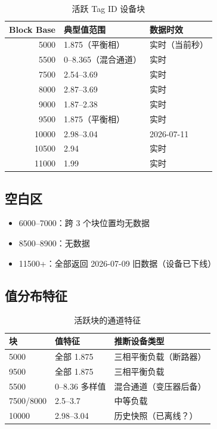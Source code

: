 \documentclass[12pt,a4paper]{ctexart}
\begin{document}
\begin{table}[H]\centering
\caption{活跃 Tag ID 设备块}
\begin{tabular}{rll}
\toprule
\textbf{Block Base} & \textbf{典型值范围} & \textbf{数据时效} \\
\midrule
5000 & 1.875（平衡相） & 实时（当前秒） \\
5500 & 0--8.365（混合通道） & 实时 \\
7500 & 2.54--3.69 & 实时 \\
8000 & 2.87--3.69 & 实时 \\
9000 & 1.87--2.38 & 实时 \\
9500 & 1.875（平衡相） & 实时 \\
10000 & 2.98--3.04 & 2026-07-11 \\
10500 & 2.94 & 实时 \\
11000 & 1.99 & 实时 \\
\bottomrule
\end{tabular}
\end{table}

\subsection{空白区}
\begin{itemize}[leftmargin=*]
  \item 6000--7000：跨 3 个块位置均无数据
  \item 8500--8900：无数据
  \item 11500+：全部返回 2026-07-09 旧数据（设备已下线）
\end{itemize}

\subsection{值分布特征}
\begin{table}[H]\centering
\caption{活跃块的通道特征}
\begin{tabular}{lll}
\toprule
\textbf{块} & \textbf{值特征} & \textbf{推断设备类型} \\
\midrule
5000 & 全部 1.875 & 三相平衡负载（断路器） \\
9500 & 全部 1.875 & 三相平衡负载 \\
5500 & 0--8.36 多样值 & 混合通道（变压器后备） \\
7500/8000 & 2.5--3.7 & 中等负载 \\
10000 & 2.98--3.04 & 历史快照（已离线？） \\
\bottomrule
\end{tabular}
\end{table}
\end{document}
